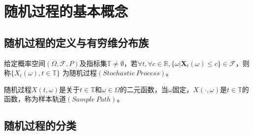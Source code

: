 \section{随机过程的基本概念}
    \subsection{随机过程的定义与有穷维分布族} 
        \begin{definition}[随机过程]

            给定概率空间$(\Omega, \mathscr{F}, P)$及指标集$\mathbb{T} \neq  \emptyset $，若$\forall t, \forall c \in \mathbb{R}, \{\omega | \textbf{X}_t(\omega) \leq c\} \in \mathscr{F}$，则称$\{X_t(\omega), t \in \mathbb{T}\}$ 为随机过程$(Stochastic\ Process)$。

        \end{definition}

        \begin{definition}[样本轨道]
            
            随机过程$X(t, \omega)$是关于$t \in \mathbb{T}$和$\omega \in \Omega$的二元函数，当$\omega$固定，$X(\cdot, \omega)$是$t \in \mathbb{T}$的函数，称为样本轨道$(Sample\ Path)$。

        \end{definition}

        \begin{definition}[有穷维分布族]
            
        \end{definition}
    \subsection{随机过程的分类}
        \begin{definition}
            
        \end{definition}